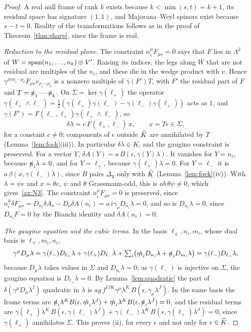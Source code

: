 \begin{proof}
A real null frame of rank $k$ exists because $k<\min(s,t)=k+1$, its residual space has signature $(1,1)$, and Majorana--Weyl spinors exist because $s-t=0$. Reality of the transformations follows as in the proof of Theorem~\ref{thm:sharp}, since the frame is real.

\emph{Reduction to the residual plane.} The constraint $n_i^\mu F_{\mu\nu}=0$ says that $F$ lies in $\Lambda^2$ of $W=\operatorname{span}(n_1,\dots,n_k)\oplus V'$. Raising its indices, the legs along $W$ that are not residual are multiples of the $n_i$, and these die in the wedge product with $v$. Hence $\gamma^{\mu\nu\rho_1\cdots\rho_k}F_{\mu\nu}v_{\rho_1\cdots\rho_k}$ is a nonzero multiple of $\gamma(F')T$, with $F'$ the residual part of $F$ and $T=\slashed{n}_1\cdots\slashed{n}_k$. On $\Sigma=\ker\gamma(\ell_+)$ the operator $\gamma(\ell_+\wedge\ell_-)=\frac12(\gamma(\ell_+)\gamma(\ell_-)-\gamma(\ell_-)\gamma(\ell_+))$ acts as $1$, and $\gamma(F')=F(\ell_-,\ell_+)\gamma(\ell_+\wedge\ell_-)$, so
\begin{equation}
\label{eq:twodelta}
\delta\lambda=c\,F(\ell_+,\ell_-)\,x,\qquad x=T\epsilon\in\Sigma,
\end{equation}
for a constant $c\ne0$; components of $\epsilon$ outside $\widehat{K}$ are annihilated by $T$ (Lemma~\ref{lem:fock}(iii)). In particular $\delta\lambda\in K$, and the gaugino constraint is preserved. For a vector $Y$, $\delta A(Y)=a\,B(\epsilon,\gamma(Y)\lambda)$. It vanishes for $Y=n_i$, because $\slashed{n}_i\lambda=0$, and for $Y=\ell_+$, because $\gamma(\ell_+)\lambda=0$. For $Y=\ell_-$ it is $a\,\beta(x,\gamma(\ell_-)\lambda)$, since $B$ pairs $\Delta_{\mathbf 1}$ only with $\widehat{K}$ (Lemma~\ref{lem:fock}(iv)). With $\lambda=\psi e$ and $x=\theta e$, $\psi$ and $\theta$ Grassmann-odd, this is $ab\,\theta\psi\ne0$, which gives~\ref{ax:N3}. The constraint $n_i^\mu F_{\mu\nu}=0$ is preserved, since $n_i^\mu\delta F_{\mu\nu}=D_{n_i}\delta A_\nu-D_\nu\delta A(n_i)=a\,\bar\epsilon\gamma_\nu D_{n_i}\lambda=0$, and so is $D_{n_i}\lambda=0$, since $D_{n_i}F=0$ by the Bianchi identity and $\delta A(n_i)=0$.

\emph{The gaugino equation and the cubic terms.} In the basis $\ell_\pm,n_i,m_i$, whose dual basis is $\ell_\mp,m_i,n_i$,
\[
\gamma^\mu D_\mu\lambda=\gamma(\ell_-)D_{\ell_+}\lambda+\gamma(\ell_+)D_{\ell_-}\lambda+\textstyle\sum_i\bigl(\slashed{m}_iD_{n_i}\lambda+\slashed{n}_iD_{m_i}\lambda\bigr)=\gamma(\ell_-)D_{\ell_+}\lambda ,
\]
because $D_\mu\lambda$ takes values in $\Sigma$ and $D_{n_i}\lambda=0$; as $\gamma(\ell_-)$ is injective on $\Sigma$, the gaugino equation is $D_{\ell_+}\lambda=0$. By Lemma~\ref{lem:quadratic} the part of $\delta(\gamma^\mu D_\mu\lambda^I)$ quadratic in $\lambda$ is $ag\,f^{IJK}\gamma^\mu\lambda^K\,B(\epsilon,\gamma_\mu\lambda^J)$. In the same basis the frame terms are $\slashed{n}_i\lambda^K B(\epsilon,\slashed{m}_i\lambda^J)+\slashed{m}_i\lambda^K B(\epsilon,\slashed{n}_i\lambda^J)=0$, and the residual terms are $\gamma(\ell_+)\lambda^K\,B(\epsilon,\gamma(\ell_-)\lambda^J)+\gamma(\ell_-)\lambda^K\,B(\epsilon,\gamma(\ell_+)\lambda^J)=0$, since $\gamma(\ell_+)$ annihilates $\Sigma$. This proves (ii), for every $\epsilon$ and not only for $\epsilon\in\widehat{K}$.


\end{proof}
